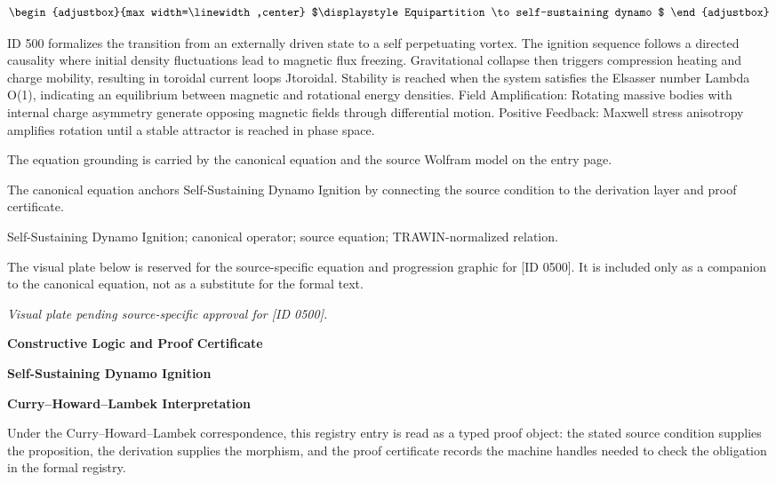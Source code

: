 \[
\begin{adjustbox}{max width=\linewidth,center}
$\displaystyle
Equipartition \to self-sustaining dynamo
$
\end{adjustbox}
\]

ID 500 formalizes the transition from an externally driven state to a self perpetuating vortex. The ignition sequence follows a directed causality where initial density fluctuations lead to magnetic flux freezing. Gravitational collapse then triggers compression heating and charge mobility, resulting in toroidal current loops Jtoroidal. Stability is reached when the system satisfies the Elsasser number Lambda O(1), indicating an equilibrium between magnetic and rotational energy densities. Field Amplification: Rotating massive bodies with internal charge asymmetry generate opposing magnetic fields through differential motion. Positive Feedback: Maxwell stress anisotropy amplifies rotation until a stable attractor is reached in phase space.

The equation grounding is carried by the canonical equation and the source Wolfram model on the entry page.

The canonical equation anchors Self-Sustaining Dynamo Ignition by connecting the source condition to the derivation layer and proof certificate.

Self-Sustaining Dynamo Ignition; canonical operator; source equation; TRAWIN-normalized relation.
\endgroup

\begingroup\footnotesize\sloppy
The visual plate below is reserved for the source-specific equation and progression graphic for [ID 0500]. It is included only as a companion to the canonical equation, not as a substitute for the formal text.
\par\endgroup
\begingroup\footnotesize\itshape
Visual plate pending source-specific approval for [ID 0500].
\par\endgroup

\clearpage
\begingroup\tzpsupportsetup
\noindent\textbf{\fontsize{10.8pt}{12.8pt}\selectfont [ID 0500] Constructive Logic and Proof Certificate}\par
\noindent\textbf{\fontsize{10pt}{12pt}\selectfont Self-Sustaining Dynamo Ignition}\par
\vspace{0.45em}
\begingroup
\footnotesize
\setlength{\parskip}{0.22em}
\setlength{\parindent}{0pt}
\noindent\textbf{Curry--Howard--Lambek Interpretation}\par
Under the Curry--Howard--Lambek correspondence, this registry entry is read as a typed proof
object: the stated source condition supplies the proposition, the derivation supplies the
morphism, and the proof certificate records the machine handles needed to check the obligation
in the formal registry.

